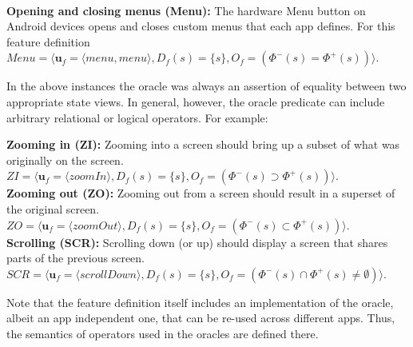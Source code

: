 \\
\indent
{\bf Opening and closing menus (Menu):} The hardware Menu button on Android devices opens and closes custom menus that each app defines. For this feature definition $\mathit{Menu} = \langle \mathbf{u}_f = \langle menu, menu\rangle, D_f(s) = \{s \}, O_f = (\Phi^-(s) = \Phi^+(s)) \rangle$.



In the above instances the oracle was always an assertion of equality between two appropriate state views. In general, however, the oracle predicate can include arbitrary relational or logical operators. %
For example:

{\bf Zooming in (ZI):} Zooming into a screen should bring up a subset of what was originally on the screen. $\mathit{ZI} = \langle \mathbf{u}_f = \langle zoomIn\rangle, D_f(s) = \{s \}, O_f = (\Phi^-(s) \supset \Phi^+(s)) \rangle$.
\\
\indent
{\bf Zooming out (ZO):} Zooming out from a screen should result in a superset of the original screen. $\mathit{ZO} = \langle \mathbf{u}_f = \langle zoomOut\rangle, D_f(s) = \{s \}, O_f = (\Phi^-(s) \subset \Phi^+(s)) \rangle$.
\\
\indent
{\bf Scrolling (SCR):} Scrolling down (or up) should display a screen that shares parts of the previous screen. $\mathit{SCR} = \langle \mathbf{u}_f = \langle scrollDown\rangle, D_f(s) = \{s \}, O_f = (\Phi^-(s) \cap \Phi^+(s) \neq \emptyset) \rangle$.

Note that the feature definition itself includes an implementation of the oracle, albeit an app independent one, that can be re-used across different apps. Thus, the semantics of operators used in the oracles are defined there.
